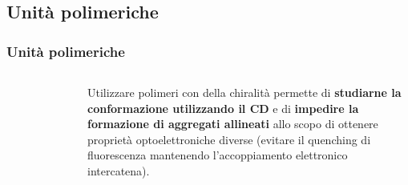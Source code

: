       \subsection{Unità polimeriche}\begin{frame}\frametitle{Unità polimeriche}
              \begin{columns}
\begin{figure}{}\end{figure} Utilizzare polimeri con della chiralità permette di \textbf{studiarne la conformazione utilizzando il CD} e di \textbf{impedire la formazione di aggregati allineati} allo scopo di ottenere proprietà optoelettroniche diverse (evitare il quenching di fluorescenza mantenendo l'accoppiamento elettronico intercatena). \cite{1} \end{columns}    
             \end{frame}    
